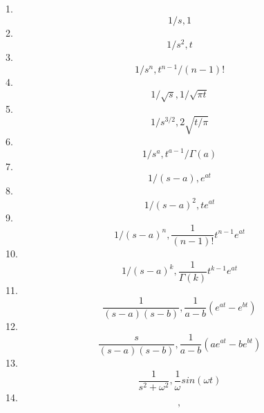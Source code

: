  1. \[ 1/s , 1 \]
 2. \[ 1/s^2 , t \]
 3. \[ 1/s^n , t^{n-1}/(n-1)! \]
 4. \[ 1/\sqrt{s} , 1/\sqrt{\pi t} \]
 5. \[ 1/s^{3/2} , 2\sqrt{t/\pi} \]
 6. \[ 1/s^a  , t^{a-1}/\Gamma(a) \]
 7. \[ 1/(s-a) , e^{at} \]
 8. \[ 1/(s-a)^2 , te^{at} \]
 9. \[ 1/(s-a)^n , \frac{1}{(n-1)!} t^{n-1}e^{at} \]
10. \[ 1/(s-a)^k , \frac{1}{\Gamma(k)} t^{k-1}e^{at} \]
11. \[ \frac{1}{(s-a)(s-b)} , \frac{1}{a-b} (e^{at} - e^{bt}) \]
12. \[ \frac{s}{(s-a)(s-b)} , \frac{1}{a-b} (ae^{at} - be^{bt}) \]
13. \[ \frac{1}{s^2 + \omega^2} , \frac{1}{\omega}sin(\omega t) \]
14. \[ , \]
